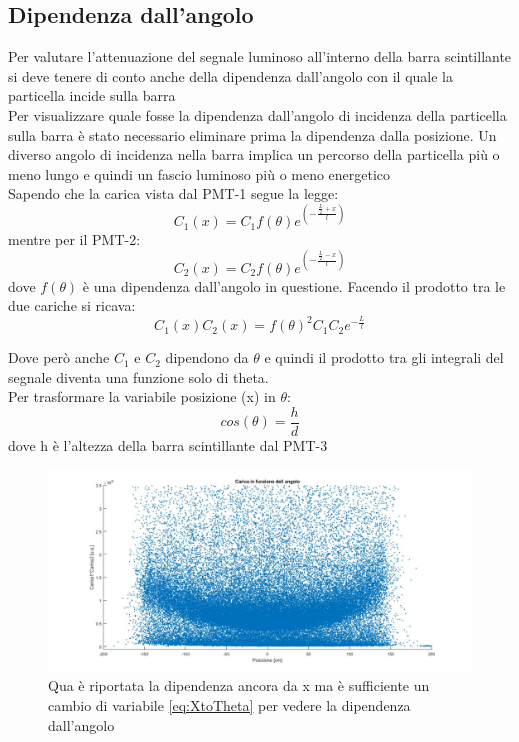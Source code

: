 \documentclass[a4paper]{article}
\begin{document}
\subsection{Dipendenza dall'angolo}
Per valutare l'attenuazione del segnale luminoso all'interno della barra scintillante si deve tenere di conto anche della dipendenza dall'angolo con il quale la particella incide sulla barra\\
Per visualizzare quale fosse la dipendenza dall'angolo di incidenza della particella sulla barra è stato necessario eliminare prima la dipendenza dalla posizione. Un diverso angolo di incidenza nella barra implica un percorso della particella più o meno lungo e quindi un fascio luminoso più o meno energetico\\
Sapendo che la carica vista dal PMT-1 segue la legge:
\begin{equation}
C_1(x) = C_1 f(\theta)e^{(-\frac{\frac{L}{2}+x}{l})}
\end{equation}
mentre per il PMT-2:
\begin{equation}
C_2(x) = C_2f(\theta)e^{(-\frac{\frac{L}{2}-x}{l})}
\end{equation}
dove $f(\theta)$ è una dipendenza dall'angolo in questione. Facendo il prodotto tra le due cariche si ricava:
\begin{equation}
C_1(x)C_2(x) = f(\theta)^2 C_1C_2 e^{-\frac{L}{l}}
\end{equation}

Dove però anche $C_1$ e $C_2$ dipendono da $\theta$ e quindi il prodotto tra gli integrali del segnale diventa una funzione solo di theta.\\
Per trasformare la variabile posizione (x) in $\theta$:
\begin{equation}
cos(\theta) = \frac{h}{d}
\label{eq:XtoTheta}
\end{equation}
dove h è l'altezza della barra scintillante dal PMT-3

\begin{figure}[H]
\centering
\includegraphics[scale=0.3]{./immagini/TimeOfFlight/DipendenzaAngolo.jpg}
\caption{Qua è riportata la dipendenza ancora da x ma è sufficiente un cambio di variabile \ref{eq:XtoTheta} per vedere la dipendenza dall'angolo}
\label{fig:DipendenzaAngolo}
\end{figure}
\end{document}
